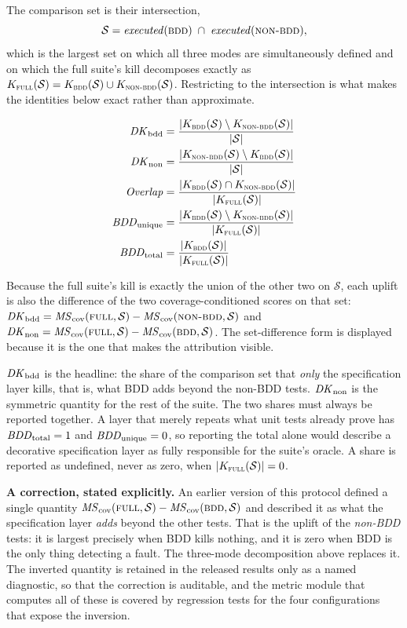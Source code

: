 The comparison set is their intersection,
\begin{equation}
\mathcal{S} = \mathit{executed}(\textsc{bdd}) \;\cap\; \mathit{executed}(\textsc{non-bdd}),
\end{equation}
which is the largest set on which all three modes are simultaneously defined and on which the full
suite's kill decomposes exactly as
$K_{\textsc{full}}(\mathcal{S}) = K_{\textsc{bdd}}(\mathcal{S}) \cup K_{\textsc{non-bdd}}(\mathcal{S})$.
Restricting to the intersection is what makes the identities below exact rather than approximate.

\begin{align}
\mathit{DK}_{\mathrm{bdd}} &= \frac{|K_{\textsc{bdd}}(\mathcal{S}) \setminus K_{\textsc{non-bdd}}(\mathcal{S})|}{|\mathcal{S}|}
        \label{eq:dk}\\
\mathit{DK}_{\mathrm{non}} &= \frac{|K_{\textsc{non-bdd}}(\mathcal{S}) \setminus K_{\textsc{bdd}}(\mathcal{S})|}{|\mathcal{S}|}
        \label{eq:dknon}\\
\mathit{Overlap} &= \frac{|K_{\textsc{bdd}}(\mathcal{S}) \cap K_{\textsc{non-bdd}}(\mathcal{S})|}{|K_{\textsc{full}}(\mathcal{S})|}
        \label{eq:overlap}\\
\mathit{BDD}_{\mathrm{unique}} &= \frac{|K_{\textsc{bdd}}(\mathcal{S}) \setminus K_{\textsc{non-bdd}}(\mathcal{S})|}{|K_{\textsc{full}}(\mathcal{S})|}
        \label{eq:bddunique}\\
\mathit{BDD}_{\mathrm{total}} &= \frac{|K_{\textsc{bdd}}(\mathcal{S})|}{|K_{\textsc{full}}(\mathcal{S})|}
        \label{eq:dkshare}
\end{align}

Because the full suite's kill is exactly the union of the other two on $\mathcal{S}$, each uplift is
also the difference of the two coverage-conditioned scores on that set:
$\mathit{DK}_{\mathrm{bdd}} = \mathit{MS}_{\mathrm{cov}}(\textsc{full},\mathcal{S}) - \mathit{MS}_{\mathrm{cov}}(\textsc{non-bdd},\mathcal{S})$ and
$\mathit{DK}_{\mathrm{non}} = \mathit{MS}_{\mathrm{cov}}(\textsc{full},\mathcal{S}) - \mathit{MS}_{\mathrm{cov}}(\textsc{bdd},\mathcal{S})$. The set-difference form is displayed
because it is the one that makes the attribution visible.

$\mathit{DK}_{\mathrm{bdd}}$ is the headline: the share of the comparison set that \emph{only} the specification layer
kills, that is, what BDD adds beyond the non-BDD tests. $\mathit{DK}_{\mathrm{non}}$ is the symmetric quantity for the
rest of the suite. The two shares must always be reported together. A layer that merely repeats what
unit tests already prove has $\mathit{BDD}_{\mathrm{total}} = 1$ and $\mathit{BDD}_{\mathrm{unique}} = 0$, so reporting the total alone would
describe a decorative specification layer as fully responsible for the suite's oracle. A share is
reported as undefined, never as zero, when $|K_{\textsc{full}}(\mathcal{S})| = 0$.

\textbf{A correction, stated explicitly.} An earlier version of this protocol defined a single
quantity $\mathit{MS}_{\mathrm{cov}}(\textsc{full},\mathcal{S}) - \mathit{MS}_{\mathrm{cov}}(\textsc{bdd},\mathcal{S})$ and described it as what the
specification layer \emph{adds} beyond the other tests. That is the uplift of the \emph{non-BDD}
tests: it is largest precisely when BDD kills nothing, and it is zero when BDD is the only thing
detecting a fault. The three-mode decomposition above replaces it. The inverted quantity is retained
in the released results only as a named diagnostic, so that the correction is auditable, and the
metric module that computes all of these is covered by regression tests for the four
configurations that expose the inversion.

